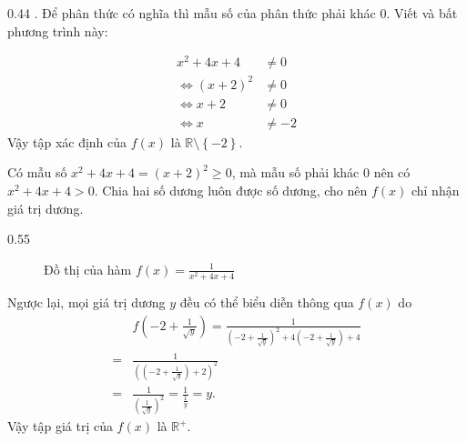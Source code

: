 {
   \begin{minipageindent}{0.44\textwidth}
. Để phân thức có nghĩa thì mẫu số của phân thức phải khác $0$. Viết và bất phương trình này:

      \begin{align*}
         x^2 + 4x + 4 &\neq 0\\
         \iff \left(x + 2\right)^2 &\neq 0\\
         \iff x + 2 &\neq 0 \\
         \iff x &\neq -2
      \end{align*}
      Vậy tập xác định của $f(x)$ là $\mathbb{R} \setminus \left\{-2\right\}$.

      Có mẫu số $x^2 + 4x + 4 = (x + 2)^2 \geq 0$, mà mẫu số phải khác $0$ nên có $x^2 + 4x + 4 > 0$. Chia hai số dương luôn được số dương, cho nên $f(x)$ chỉ nhận giá trị dương.
   \end{minipageindent}
   \hfill
   \begin{minipageindent}{0.55\textwidth}
      \begin{figure}[H]
         \centering
         \caption{Đồ thị của hàm $f(x) = \frac{1}{x^2 + 4x + 4}$}
         \label{fig:ham_so_mot_bien:phan_thuc:1_x2_4x_4}
      \end{figure}
   \end{minipageindent}
}

Ngược lại, mọi giá trị dương $y$ đều có thể biểu diễn thông qua $f(x)$ do \begin{align*}
   &f\left(-2 + \frac{1}{\sqrt{y}}\right) = \frac{1}{\left(-2 + \frac{1}{\sqrt{y}}\right)^2 + 4\left(-2 + \frac{1}{\sqrt{y}}\right) + 4}\\
   =& \frac{1}{\left(\left(-2 + \frac{1}{\sqrt{y}}\right) + 2\right)^2} \\
   =&\frac{1}{\left(\frac{1}{\sqrt{y}}\right)^2} =\frac{1}{\frac{1}{y}} =y.
\end{align*}
Vậy tập giá trị của $f(x)$ là $\mathbb{R}^+$.

